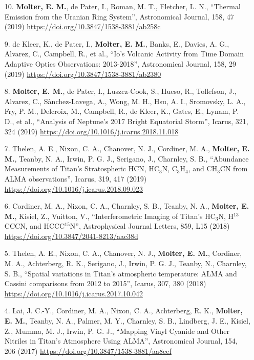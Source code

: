 \documentclass[margin, 10pt]{res} %
\begin{document}
\begin{resume}
{\begin{enumerate}
\item[10.] {\bf Molter, E. M.}, de Pater, I., Roman, M. T., Fletcher, L. N., ``Thermal Emission from the Uranian Ring System'', Astronomical Journal, 158, 47 (2019) \url{https://doi.org/10.3847/1538-3881/ab258c}

\item[9.] de Kleer, K., de Pater, I., {\bf Molter, E. M.}, Banks, E., Davies, A. G., Alvarez, C., Campbell, R., et al., ``Io's Volcanic Activity from Time Domain Adaptive Optics Observations: 2013-2018'', Astronomical Journal, 158, 29 (2019) \url{https://doi.org/10.3847/1538-3881/ab2380}

\item[8.] {\bf Molter, E. M.}, de Pater, I., Luszcz-Cook, S., Hueso, R., Tollefson, J., Alvarez, C., S\`anchez-Lavega, A., Wong, M. H., Hsu, A. I., Sromovsky, L. A., Fry, P. M., Delcroix, M., Campbell, R., de Kleer, K., Gates, E., Lynam, P. D., et al., ``Analysis of Neptune's 2017 Bright Equatorial Storm'', Icarus, 321, 324 (2019) \url{https://doi.org/10.1016/j.icarus.2018.11.018}

\item[7.] Thelen, A. E., Nixon, C. A., Chanover, N. J., Cordiner, M. A., {\bf Molter, E. M.}, Teanby, N. A., Irwin, P. G. J., Serigano, J., Charnley, S. B., ``Abundance Measurements of Titan's Stratospheric HCN, HC$_3$N, C$_3$H$_4$, and CH$_3$CN from ALMA observations'', Icarus, 319, 417 (2019) \url{https://doi.org/10.1016/j.icarus.2018.09.023}

\item[6.] Cordiner, M. A., Nixon, C. A., Charnley, S. B., Teanby, N. A., {\bf Molter, E. M.}, Kisiel, Z., Vuitton, V., ``Interferometric Imaging of Titan's HC$_3$N, H$^{13}$\textrm{CCC}N, and HCCC$^{15}$N'', Astrophysical Journal Letters, 859, L15 (2018) \url{https://doi.org/10.3847/2041-8213/aac38d}

\item[5.] Thelen, A. E.,  Nixon, C. A., Chanover, N. J., {\bf Molter, E. M.}, Cordiner, M. A., Achterberg, R. K., Serigano, J., Irwin, P. G. J., Teanby, N., Charnley, S. B., ``Spatial variations in Titan's atmospheric temperature: ALMA and Cassini comparisons from 2012 to 2015'', Icarus, 307, 380 (2018) \url{https://doi.org/10.1016/j.icarus.2017.10.042}

\item[4.] Lai, J. C.-Y., Cordiner, M. A., Nixon, C. A., Achterberg, R. K., {\bf Molter, E. M.}, Teanby, N. A., Palmer, M. Y., Charnley, S. B., Lindberg, J. E., Kisiel, Z., Mumma, M. J., Irwin, P. G. J., ``Mapping Vinyl Cyanide and Other Nitriles in Titan’s Atmosphere Using ALMA'', Astronomical Journal, 154, 206 (2017) \url{https://doi.org/10.3847/1538-3881/aa8eef}


\end{enumerate}}
\end{resume}
\end{document}
